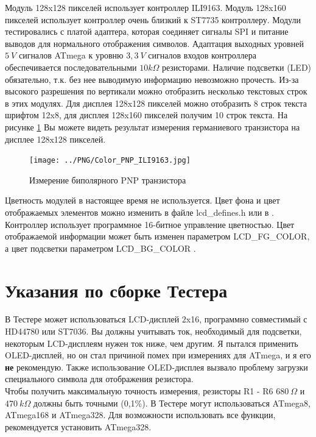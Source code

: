 Модуль 128x128 пикселей использует контроллер ILI9163.
Модуль 128x160 пикселей использует контроллер очень близкий к ST7735 контроллеру.
Модули тестировались с платой адаптера, которая соединяет сигналы SPI и питание выводов для 
нормального отображения символов. Адаптация выходных уровней \(5~V\) сигналов ATmega к уровню \(3,3~V\) 
сигналов входов контроллера обеспечивается последовательными \(10 k\Omega\) резисторами.
Наличие подсветки (LED) обязательно, т.к. без нее выводимую информацию невозможно прочесть.
Из-за высокого разрешения по вертикали можно отобразить несколько текстовых строк в этих модулях.
Для дисплея 128x128 пикселей можно отобразить 8 строк текста шрифтом 12x8,
для дисплея 128x160 пикселей получим 10 строк текста.
На рисунке \ref{fig:Color_PNP} Вы можете видеть результат измерения германиевого транзистора
на дисплее 128x128 пикселей.

\begin{figure}[H]
\centering
\texttt{[image: ../PNG/Color\_PNP\_ILI9163.jpg]}
\caption{Измерение биполярного PNP транзистора}
\label{fig:Color_PNP}
\end{figure}

Цветность модулей в настоящее время не используется.
Цвет фона и цвет отображаемых элементов можно изменить в файле lcd\_defines.h или
в .
Контроллер использует программное 16-битное управление цветностью. Цвет отображаемой информации может 
быть изменен параметром LCD\_FG\_COLOR, а цвет подсветки параметром LCD\_BG\_COLOR .



\section{Указания по сборке Тестера }

В Тестере может использоваться LCD-дисплей 2x16, программно совместимый с HD44780 или ST7036. Вы должны учитывать ток, 
необходимый для подсветки, некоторым LCD-дисплеям нужен ток ниже, чем другим. Я пытался применить OLED-дисплей, но он 
стал причиной помех при измерениях для ATmega, и я его \textbf{ не} рекомендую. Также использование OLED-дисплея вызвало 
проблему загрузки специального символа для отображения резистора.\\

Чтобы получить максимальную точность измерения, резисторы R1 - R6 \(680~\Omega\) и
\(470~k\Omega\) должны быть точными (0,1\%). В Тестере могут использоваться ATmega8, ATmega168 и ATmega328. Для 
возможности использовать все функции, рекомендуется установить ATmega328.\\
 

